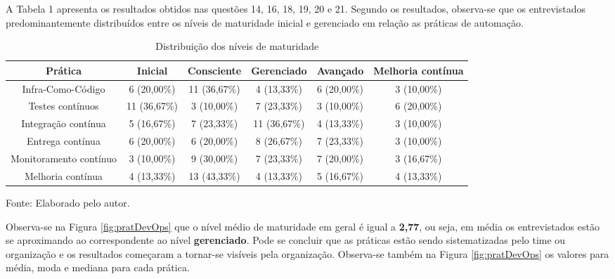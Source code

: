 \documentclass[twoside,english,brazilian]{UNISINOSartigo}
\newcommand{\source}[1]{\caption*{Fonte: {#1}} }
\begin{document}
A Tabela 1 apresenta os resultados obtidos nas questões 14, 16, 18, 19, 20 e 21. Segundo os resultados, observa-se que os entrevistados predominantemente distribuídos entre os níveis de maturidade inicial e gerenciado em relação as práticas de automação.
\setlength{\belowcaptionskip}{0.0pt}
\begin{table}[H]
\footnotesize
\caption{Distribuição dos níveis de maturidade}
    \begin{tabularx}{\columnwidth}{cccccc}
    \hline
       Prática                  &    Inicial &    Consciente &    Gerenciado &    Avançado &    Melhoria contínua \\ \hline 
       Infra-Como-Código        &    6 (20,00\%)  &    11 (36,67\%)    &    4 (13,33\%)    &    6 (20,00\%)  &    3 (10,00\%)           \\
       Testes   contínuos       &    11 (36,67\%) &    3 (10,00\%)    &    7 (23,33\%)    &    3 (10,00\%)  &    6 (20,00\%)           \\
       Integração   contínua    &    5 (16,67\%)  &    7 (23,33\%)    &    11 (36,67\%)    &    4 (13,33\%)  &    3 (10,00\%)           \\
       Entrega   contínua       &    6 (20,00\%) &    6 (20,00\%)    &    8 (26,67\%)    &    7 (23,33\%)  &    3 (10,00\%)           \\ 
       Monitoramento   contínuo &    3 (10,00\%) &    9 (30,00\%)    &    7 (23,33\%)    &    7 (20,00\%)  &    3 (16,67\%)           \\
       Melhoria   contínua      &    4 (13,33\%) &    13 (43,33\%)    &    4 (13,33\%)    &    5 (16,67\%)  &    4 (13,33\%)           \\ \hline
    \end{tabularx}
    \source{Elaborado pelo autor.}
\end{table}
Observa-se na Figura \ref{fig:pratDevOps} que o nível médio de maturidade em geral é igual a \textbf{2,77}, ou seja, em média os entrevistados estão se aproximando ao correspondente ao nível \textbf{gerenciado}. Pode se concluir que as práticas estão sendo sistematizadas pelo time ou organização e os resultados começaram a tornar-se visíveis pela organização. Observa-se também na Figura \ref{fig:pratDevOps} os valores para média, moda e mediana para cada prática. 
\end{document}
